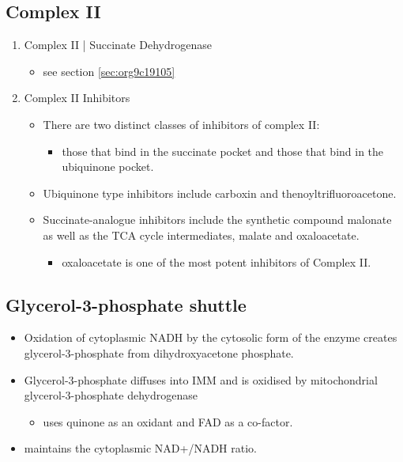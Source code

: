 \documentclass{scrartcl}
\begin{document}
\subsection{Complex II}
\label{sec:orgb97d10d}
\begin{enumerate}
\item Complex II | Succinate Dehydrogenase
\label{sec:org065c7d7}
\begin{itemize}
\item see section \ref{sec:org9c19105}
\end{itemize}

\item Complex II Inhibitors
\label{sec:orgf131cae}
\begin{itemize}
\item There are two distinct classes of inhibitors of complex II:
\begin{itemize}
\item those that bind in the succinate pocket and those that bind in the ubiquinone pocket.
\end{itemize}
\item Ubiquinone type inhibitors include carboxin and thenoyltrifluoroacetone.
\item Succinate-analogue inhibitors include the synthetic compound malonate as well as the TCA cycle intermediates, malate and oxaloacetate.
\begin{itemize}
\item oxaloacetate is one of the most potent inhibitors of Complex II.
\end{itemize}
\end{itemize}
\end{enumerate}

\subsection{Glycerol-3-phosphate shuttle}
\label{sec:org896fd20}
\begin{itemize}
\item Oxidation of cytoplasmic NADH by the cytosolic form of the enzyme
creates glycerol-3-phosphate from dihydroxyacetone phosphate.
\item Glycerol-3-phosphate diffuses into IMM and is oxidised by mitochondrial glycerol-3-phosphate dehydrogenase
\begin{itemize}
\item uses quinone as an oxidant and FAD as a co-factor.
\end{itemize}
\item maintains the cytoplasmic NAD+/NADH ratio.
\end{itemize}
\end{document}
